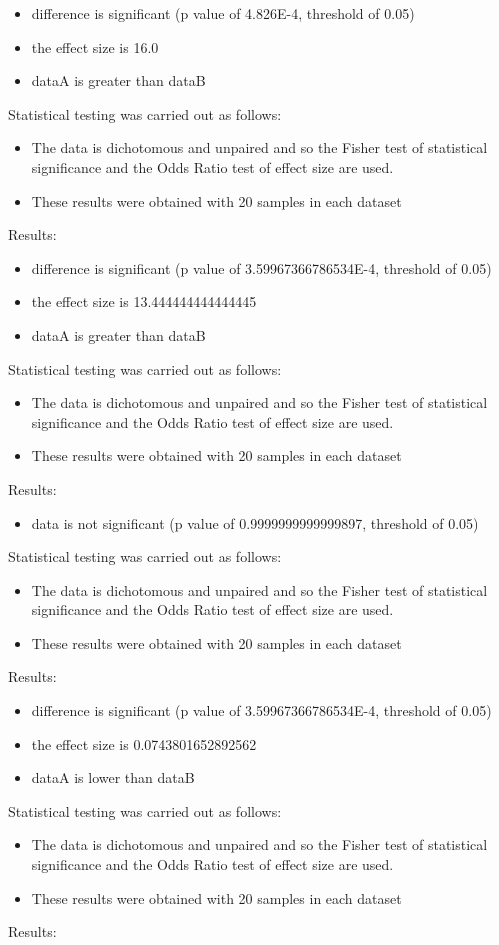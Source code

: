\documentclass[]{article}
\begin{document}
\begin{itemize}
\item{difference is significant (p value of 4.826E-4, threshold of 0.05)}
\item{the effect size is 16.0}
\item{dataA is greater than dataB}
\end{itemize}Statistical testing was carried out as follows: \begin{itemize}
\item{The data is dichotomous and unpaired and so the Fisher test of statistical significance and the Odds Ratio test of effect size are used.}
\item{These results were obtained with 20 samples in each dataset}
\end{itemize}Results:
\begin{itemize}
\item{difference is significant (p value of 3.59967366786534E-4, threshold of 0.05)}
\item{the effect size is 13.444444444444445}
\item{dataA is greater than dataB}
\end{itemize}Statistical testing was carried out as follows: \begin{itemize}
\item{The data is dichotomous and unpaired and so the Fisher test of statistical significance and the Odds Ratio test of effect size are used.}
\item{These results were obtained with 20 samples in each dataset}
\end{itemize}Results:
\begin{itemize}
\item{data is not significant (p value of 0.9999999999999897, threshold of 0.05)}
\end{itemize}Statistical testing was carried out as follows: \begin{itemize}
\item{The data is dichotomous and unpaired and so the Fisher test of statistical significance and the Odds Ratio test of effect size are used.}
\item{These results were obtained with 20 samples in each dataset}
\end{itemize}Results:
\begin{itemize}
\item{difference is significant (p value of 3.59967366786534E-4, threshold of 0.05)}
\item{the effect size is 0.0743801652892562}
\item{dataA is lower than dataB}
\end{itemize}Statistical testing was carried out as follows: \begin{itemize}
\item{The data is dichotomous and unpaired and so the Fisher test of statistical significance and the Odds Ratio test of effect size are used.}
\item{These results were obtained with 20 samples in each dataset}
\end{itemize}Results:
\end{document}
